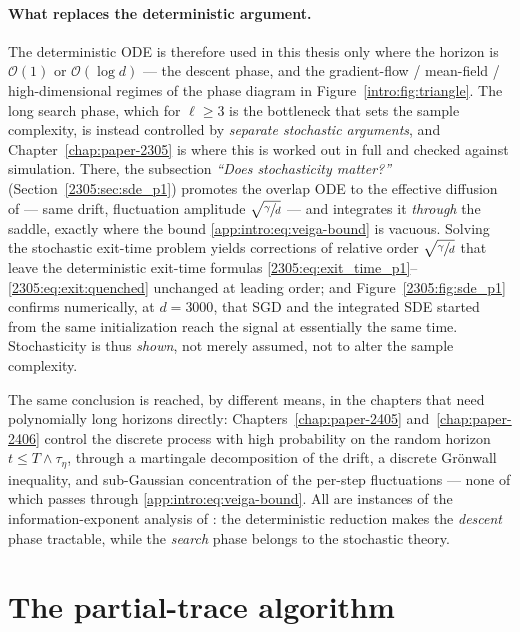\paragraph{What replaces the deterministic argument.}
The deterministic ODE is therefore used in this thesis only where the horizon is
\(\mathcal{O}(1)\) or \(\mathcal{O}(\log d)\) --- the descent phase, and the
gradient-flow / mean-field / high-dimensional regimes of the phase diagram in
Figure~\ref{intro:fig:triangle}. The long search phase, which for \(\ell \geq 3\)
is the bottleneck that sets the sample complexity, is instead controlled by
\emph{separate stochastic arguments}, and Chapter~\ref{chap:paper-2305} is where
this is worked out in full and checked against simulation. There, the subsection
\emph{``Does stochasticity matter?''} (Section~\ref{2305:sec:sde_p1}) promotes the
overlap ODE to the effective diffusion of \citet{arous2022high} --- same drift,
fluctuation amplitude \(\sqrt{\sfrac{\gamma}{d}}\) --- and integrates it
\emph{through} the saddle, exactly where the bound \eqref{app:intro:eq:veiga-bound}
is vacuous. Solving the stochastic exit-time problem yields corrections of
relative order \(\sqrt{\sfrac{\gamma}{d}}\) that leave the deterministic exit-time
formulas \eqref{2305:eq:exit_time_p1}--\eqref{2305:eq:exit:quenched} unchanged at
leading order; and Figure~\ref{2305:fig:sde_p1} confirms numerically, at
\(d = 3000\), that SGD and the integrated SDE started from the same initialization
reach the signal at essentially the same time. Stochasticity is thus \emph{shown},
not merely assumed, not to alter the sample complexity.

The same conclusion is reached, by different means, in the chapters that need
polynomially long horizons directly: Chapters~\ref{chap:paper-2405}
and~\ref{chap:paper-2406} control the discrete process with high probability on the
random horizon \(t \leq T \wedge \tau_\eta\), through a martingale decomposition of
the drift, a discrete Gr\"onwall inequality, and sub-Gaussian concentration of the
per-step fluctuations --- none of which passes through
\eqref{app:intro:eq:veiga-bound}. All are instances of the information-exponent
analysis of \citet{arous2021online}: the deterministic reduction makes the
\emph{descent} phase tractable, while the \emph{search} phase belongs to the
stochastic theory.

\section{The partial-trace algorithm}
\label{app:intro:partial-trace}

